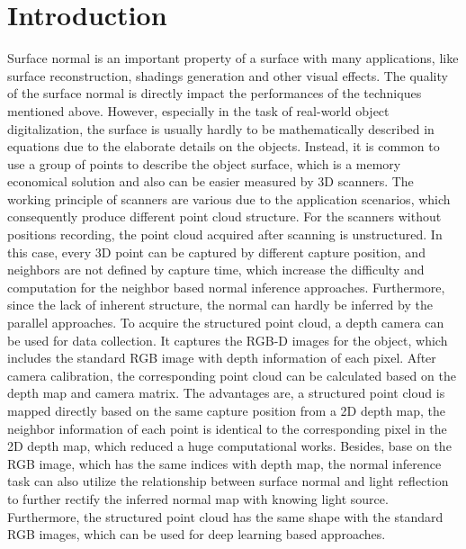 
\chapter{Introduction} %

\label{ch:introduction} %

Surface normal is an important property of a surface with many applications, like surface reconstruction, shadings generation and other visual effects. The quality of the surface normal is directly impact the performances of the techniques mentioned above. However, especially in the task of real-world object digitalization, the surface is usually hardly to be mathematically described in equations due to the elaborate details on the objects. Instead, it is common to use a group of points to describe the object surface, which is a memory economical solution and also can be easier measured by 3D scanners.  The working principle of scanners are various due to the application scenarios, which consequently produce different point cloud structure. For the scanners without positions recording, the point cloud acquired after scanning is unstructured. In this case, every 3D point can be captured by different capture position, and neighbors are not defined by capture time, which increase the difficulty and computation for the neighbor based normal inference approaches.  Furthermore, since the lack of inherent structure, the normal can hardly be inferred by the parallel approaches. 
To acquire the structured point cloud, a depth camera can be used for data collection. It captures the RGB-D images for the object, which includes the standard RGB image with depth information of each pixel. After camera calibration, the corresponding point cloud can be calculated based on the depth map and camera matrix. The advantages are, a structured point cloud is mapped directly based on the same capture position from a 2D depth map, the neighbor information of each point is identical to the corresponding pixel in the 2D depth map, which reduced a huge computational works. Besides, base on the RGB image, which has the same indices with depth map, the normal inference task can also utilize the relationship between surface normal and light reflection to further rectify the inferred normal map with knowing light source. Furthermore, the structured point cloud has the same shape with the standard RGB images, which can be used for deep learning based approaches. 
